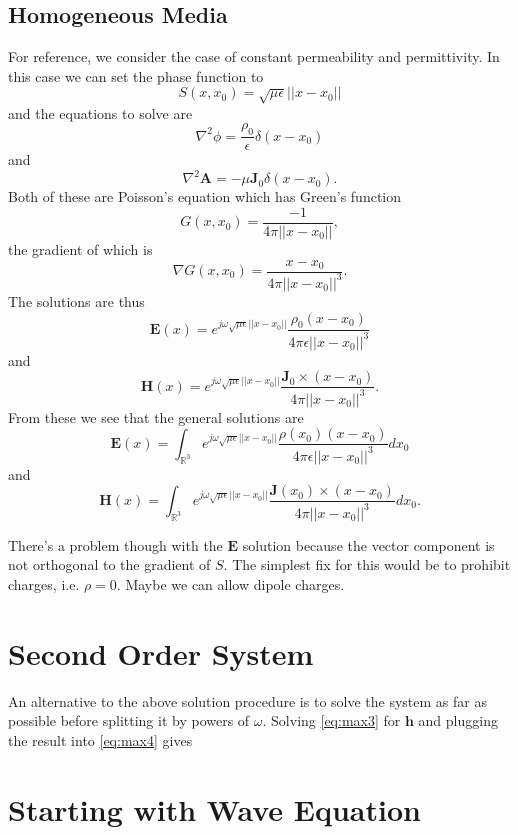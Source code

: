 \documentclass{article}
\newcommand{\norm}[1]{||#1||}
\theoremstyle{plain}
\begin{document}
\subsection{Homogeneous Media}

For reference, we consider the case of constant permeability and permittivity. In this case we can set the phase function to
\begin{equation}
	S(x,x_0) = \sqrt{\mu\epsilon}\norm{x-x_0}
\end{equation}
and the equations to solve are
\begin{equation}
	\nabla^2\phi = \frac{\rho_0}{\epsilon}\delta(x-x_0)
\end{equation}
and
\begin{equation}
	\nabla^2\mathbf{A} = -\mu\mathbf{J}_0\delta(x-x_0).
\end{equation}
Both of these are Poisson's equation which has Green's function
\begin{equation}
	G(x,x_0) = \frac{-1}{4\pi\norm{x-x_0}},
\end{equation}
the gradient of which is
\begin{equation}
	\nabla G(x,x_0) = \frac{x-x_0}{4\pi\norm{x-x_0}^3}.
\end{equation}
The solutions are thus
\begin{equation}
	\mathbf{E}(x) = e^{j\omega\sqrt{\mu\epsilon}\norm{x-x_0}}\frac{\rho_0(x-x_0)}{4\pi\epsilon\norm{x-x_0}^3}
\end{equation}
and
\begin{equation}
	\mathbf{H}(x) = e^{j\omega\sqrt{\mu\epsilon}\norm{x-x_0}}\frac{\mathbf{J}_0\times(x-x_0)}{4\pi\norm{x-x_0}^3}.
\end{equation}
From these we see that the general solutions are
\begin{equation}
	\mathbf{E}(x) = \int_{\mathbb{R}^3} e^{j\omega\sqrt{\mu\epsilon}\norm{x-x_0}}\frac{\rho(x_0)(x-x_0)}{4\pi\epsilon\norm{x-x_0}^3} dx_0
\end{equation}
and
\begin{equation}
	\mathbf{H}(x) = \int_{\mathbb{R}^3} e^{j\omega\sqrt{\mu\epsilon}\norm{x-x_0}}\frac{\mathbf{J}(x_0)\times(x-x_0)}{4\pi\norm{x-x_0}^3} dx_0.
\end{equation}

There's a problem though with the $\mathbf{E}$ solution because the vector component is not orthogonal to the gradient of $S$. The simplest fix for this would be to prohibit charges, i.e. $\rho=0$. Maybe we can allow dipole charges.



\section{Second Order System}

An alternative to the above solution procedure is to solve the system as far as possible before splitting it by powers of $\omega$. Solving \eqref{eq:max3} for $\mathbf{h}$ and plugging the result into \eqref{eq:max4} gives



\section{Starting with Wave Equation}
\end{document}

